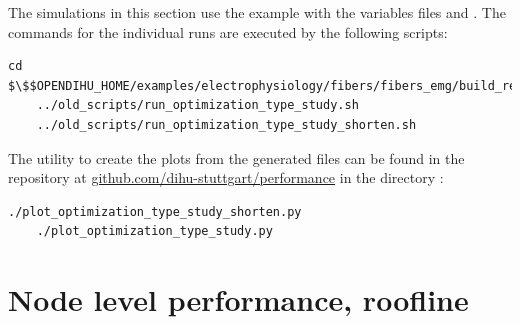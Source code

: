 
\begin{reproduce}
  The simulations in this section use the example 
   with the variables files  and .
  The commands for the individual runs are executed by the following scripts:
  \begin{lstlisting}[columns=fullflexible,breaklines=true,postbreak=\mbox{\textcolor{gray}{$\hookrightarrow$}\space}]
    cd $\$$OPENDIHU_HOME/examples/electrophysiology/fibers/fibers_emg/build_release
    ../old_scripts/run_optimization_type_study.sh
    ../old_scripts/run_optimization_type_study_shorten.sh
  \end{lstlisting}
  The utility to create the plots from the generated  files can be found in the repository at \href{https://github.com/dihu-stuttgart/performance}{github.com/dihu-stuttgart/performance}
  in the directory :
  \begin{lstlisting}[columns=fullflexible,breaklines=true,postbreak=\mbox{\textcolor{gray}{$\hookrightarrow$}\space}]
    ./plot_optimization_type_study_shorten.py
    ./plot_optimization_type_study.py
  \end{lstlisting}
\end{reproduce}

\fi
\section{Node level performance, roofline}

